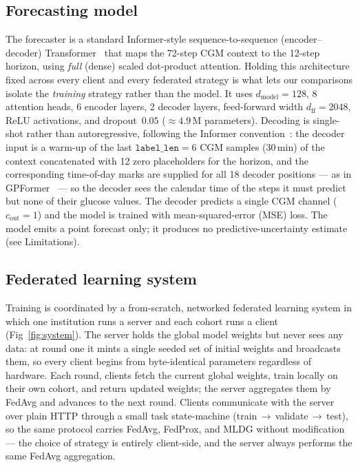 \documentclass[10pt,letterpaper]{article}
\begin{document}
\subsection*{Forecasting model}

The forecaster is a standard Informer-style sequence-to-sequence
(encoder--decoder) Transformer~\cite{zhou2021informer} that maps
the 72-step CGM context to the 12-step horizon, using \emph{full}
(dense) scaled dot-product attention.
Holding this architecture fixed across every client and every federated
strategy is what lets our comparisons isolate the \emph{training} strategy rather
than the model. It uses
$d_{\text{model}}=128$, 8 attention heads, 6 encoder layers, 2 decoder layers,
feed-forward width $d_{\text{ff}}=2048$, ReLU activations, and dropout~$0.05$
($\approx 4.9$\,M parameters). Decoding is single-shot rather than
autoregressive, following the Informer convention~\cite{zhou2021informer}: the
decoder input is a warm-up of the last $\texttt{label\_len}=6$ CGM samples
(30\,min) of the context concatenated with 12 zero placeholders for the horizon,
and the corresponding time-of-day marks are supplied for all 18 decoder
positions --- as in GPFormer~\cite{zhu2024gpformer} --- so the decoder sees the
calendar time of the steps it must predict but
none of their glucose values. The decoder predicts a single CGM channel ($c_{\text{out}}=1$) and the
model is trained with mean-squared-error (MSE) loss. The model emits a point
forecast only; it produces no predictive-uncertainty estimate (see Limitations).

\subsection*{Federated learning system}

Training is coordinated by a from-scratch, networked federated learning system
in which one institution runs a server and each cohort runs a client
(Fig~\ref{fig:system}). The server
holds the global model weights but never sees any data: at round one it mints a
single seeded set of initial weights and broadcasts them, so every client begins
from byte-identical parameters regardless of hardware. Each round, clients fetch
the current global weights, train locally on their own cohort, and return updated
weights; the server aggregates them by FedAvg and advances to the next round.
Clients communicate with the server over plain HTTP through a small task
state-machine (train\,$\rightarrow$\,validate\,$\rightarrow$\,test), so the same
protocol carries FedAvg, FedProx, and MLDG without modification --- the choice of
strategy is entirely client-side, and the server always performs the same FedAvg
aggregation.
\end{document}
